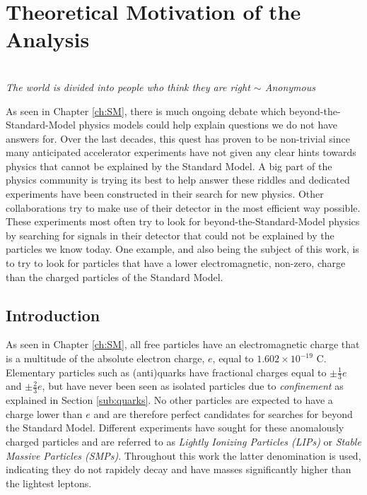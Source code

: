 \chapter{Theoretical Motivation of the Analysis}
\begin{flushright}
\textit{\\The world is divided into people who think they are right $\sim$ Anonymous\\}
\end{flushright}

\noindent As seen in Chapter \ref{ch:SM}, there is much ongoing debate which beyond-the-Standard-Model physics models could help explain questions we do not have answers for. Over the last decades, this quest has proven to be non-trivial since many anticipated accelerator experiments have not given any clear hints towards physics that cannot be explained by the Standard Model. A big part of the physics community is trying its best to help answer these riddles and dedicated experiments have been constructed in their search for new physics. Other collaborations try to make use of their detector in the most efficient way possible. These experiments most often try to look for beyond-the-Standard-Model physics by searching for signals in their detector that could not be explained by the particles we know today. One example, and also being the subject of this work, is to try to look for particles that have a lower electromagnetic, non-zero, charge than the charged particles of the Standard Model.

\section{Introduction}
As seen in Chapter \ref{ch:SM}, all free particles have an electromagnetic charge that is a multitude of the absolute electron charge, $e$, equal to $1.602 \times 10^{-19}$ C. Elementary particles such as (anti)quarks have fractional charges equal to $\pm\frac{1}{3}e$ and $\pm\frac{2}{3}e$, but have never been seen as isolated particles due to \textit{confinement} as explained in Section \ref{sub:quarks}. No other particles are expected to have a charge lower than $e$ and are therefore perfect candidates for searches for beyond the Standard Model. Different experiments have sought for these anomalously charged particles and are referred to as \textit{Lightly Ionizing Particles (LIPs)} or \textit{Stable Massive Particles (SMPs)}. Throughout this work the latter denomination is used, indicating they do not rapidely decay and have masses significantly higher than the lightest leptons.

